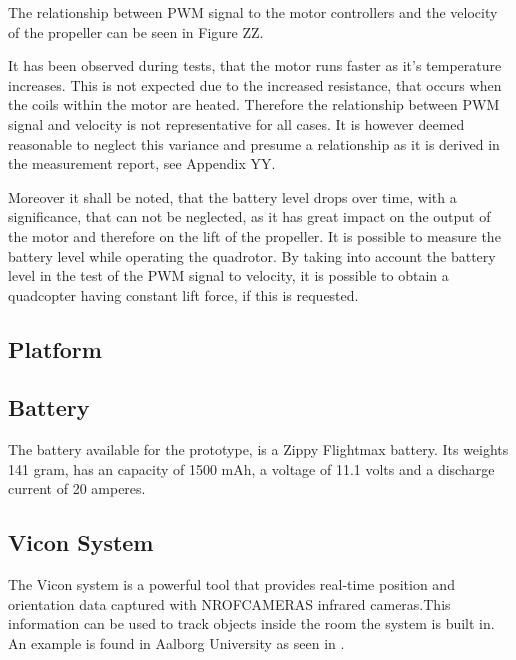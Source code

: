 The relationship between PWM signal to the motor controllers and the velocity of the propeller can be seen in Figure ZZ. 


It has been observed during tests, that the motor runs faster as it's temperature increases. This is not expected due to the increased resistance, that occurs when the coils within the motor are heated. Therefore the relationship between PWM signal and velocity is not representative for all cases. It is however deemed reasonable to neglect this variance and presume a relationship as it is derived in the measurement report, see Appendix YY. 


Moreover it shall be noted, that the battery level drops over time, with a significance, that can not be neglected, as it has great impact on the output of the motor and therefore on the lift of the propeller. It is possible to measure the battery level while operating the quadrotor. By taking into account the battery level in the test of the PWM signal to velocity, it is possible to obtain a quadcopter having constant lift force, if this is requested. 

\subsection{Platform}

\subsection{Battery}

The battery available for the prototype, is a Zippy Flightmax battery. Its weights 141 gram, has an capacity of 1500 mAh, a voltage of 11.1 volts and a discharge current of 20 amperes. 


\subsection{Vicon System}

The Vicon system is a powerful tool that provides real-time position and orientation data captured with NROFCAMERAS infrared cameras.This information can be used to track objects inside the room the system is built in. An example is found in Aalborg University as seen in . 


